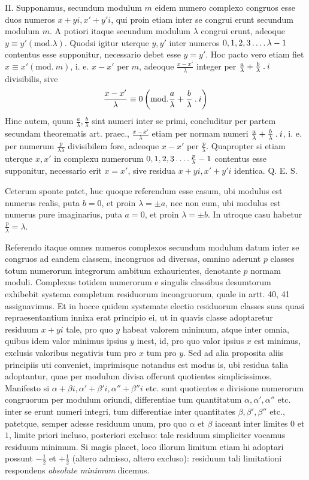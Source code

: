II. Supponamus, secundum modulum $m$ eidem numero complexo congruos esse duos numeros $x+yi,x'+y'i$, qui proin etiam inter se congrui erunt secundum modulum $m$. A potiori itaque secundum modulum $\lambda$ congrui erunt, adeoque $y\equiv y'(\mathrm{mod.}\lambda)$. Quodsi igitur uterque $y,y'$ inter numeros $0,1,2,3\mathinner{.\,.\,.\,.}\lambda-1$ contentus esse supponitur, necessario debet esse $y=y'$. Hoc pacto vero etiam fiet $x\equiv x'(\mathrm{mod.}\ m)$, i. e. $x-x'$ per $m$, adeoque $\frac{x-x'}\lambda$ integer per $\frac a\lambda+\frac b\lambda\mathbin{.} i$ divisibilis, sive
\[
\frac{x-x'}\lambda\equiv0\left(\mathrm{mod.}\frac a\lambda+\frac b\lambda\mathbin{.} i\right)
\]
Hinc autem, quum $\frac a\lambda,\frac b\lambda$ sint numeri inter se primi, concluditur per partem secundam theorematis art. praec., $\frac{x-x'}\lambda$ etiam per normam numeri $\frac a\lambda+\frac b\lambda\mathbin{.} i$, i. e. per numerum $\frac p{\lambda\lambda}$ divisibilem fore, adeoque $x-x'$ per $\frac p\lambda$. Quapropter si etiam uterque $x,x'$ in complexu numerorum $0,1,2,3\mathinner{.\,.\,.\,.}\frac p\lambda-1$ contentus esse supponitur, necessario erit $x=x'$, sive residua $x+yi,x'+y'i$ identica. Q. E. S.

Ceterum sponte patet, huc quoque referendum esse casum, ubi modulus est numerus realis, puta $b=0$, et proin $\lambda=\pm a$, nec non eum, ubi modulus est numerus pure imaginarius, puta $a=0$, et proin $\lambda=\pm b$. In utroque casu habetur $\frac p\lambda=\lambda$.

%
Referendo itaque omnes numeros complexos secundum modulum datum inter se congruos ad eandem classem, incongruos ad diversas, omnino aderunt $p$ classes totum numerorum integrorum ambitum exhaurientes, denotante $p$ normam moduli. Complexus totidem numerorum e singulis classibus desumtorum exhibebit systema completum residuorum incongruorum, quale in artt. 40, 41 assignavimus. Et in hocce quidem systemate electio residuorum classes suas quasi repraesentantium innixa erat principio ei, ut in quavis classe adoptaretur residuum $x+yi$ tale, pro quo $y$ habeat valorem minimum, atque inter omnia, quibus idem valor minimus ipsius $y$ inest, id, pro quo valor ipsius $x$ est minimus, exclusis valoribus negativis tum pro $x$ tum pro $y$. Sed ad alia proposita aliis principiis uti conveniet, imprimisque notandus est modus is, ubi residua talia adoptantur, quae per modulum divisa offerunt quotientes simplicissimos. Manifesto si $\alpha+\beta i,\alpha'+\beta'i,\alpha''+\beta''i$ etc. sunt quotientes e divisione numerorum congruorum per modulum oriundi, differentiae tum quantitatum $\alpha,\alpha',\alpha''$ etc. inter se erunt numeri integri, tum differentiae inter quantitates $\beta,\beta',\beta''$ etc., patetque, semper adesse residuum unum, pro quo $\alpha$ et $\beta$ iaceant inter limites $0$ et $1$, limite priori incluso, posteriori excluso: tale residuum simpliciter vocamus residuum minimum. Si magis placet, loco illorum limitum etiam hi adoptari possunt $-\frac12$ et $+\frac12$ (altero admisso, altero excluso): residuum tali limitationi respondens \emph{absolute minimum} dicemus.

